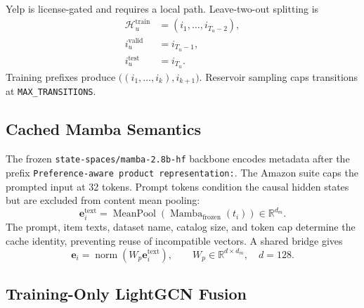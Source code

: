 \documentclass[11pt,a4paper]{article}
\newcommand{\R}{\mathbb{R}}
\begin{document}
Yelp is license-gated and requires a local path. Leave-two-out splitting is
\begin{align}
  \mathcal H_u^{\mathrm{train}}&=(i_1,\ldots,i_{T_u-2}),\\
  i_u^{\mathrm{valid}}&=i_{T_u-1},\\
  i_u^{\mathrm{test}}&=i_{T_u}.
\end{align}
Training prefixes produce $\big((i_1,\ldots,i_k),i_{k+1}\big)$. Reservoir sampling caps transitions at \texttt{MAX\_TRANSITIONS}.

\subsection{Cached Mamba Semantics}

The frozen \texttt{state-spaces/mamba-2.8b-hf} backbone encodes metadata after
the prefix \texttt{Preference-aware product representation:}. The Amazon suite
caps the prompted input at 32 tokens. Prompt tokens condition the causal hidden
states but are excluded from content mean pooling:
\begin{equation}
  \bm e_i^{\mathrm{text}}
  =
  \operatorname{MeanPool}
  \left(\operatorname{Mamba}_{\mathrm{frozen}}(t_i)\right)
  \in\R^{d_m}.
\end{equation}
The prompt, item texts, dataset name, catalog size, and token cap determine the
cache identity, preventing reuse of incompatible vectors. A shared bridge gives
\begin{equation}
  \bm e_i=\operatorname{norm}(W_p\bm e_i^{\mathrm{text}}),
  \qquad W_p\in\R^{d\times d_m},\quad d=128.
\end{equation}

\subsection{Training-Only LightGCN Fusion}
\end{document}
